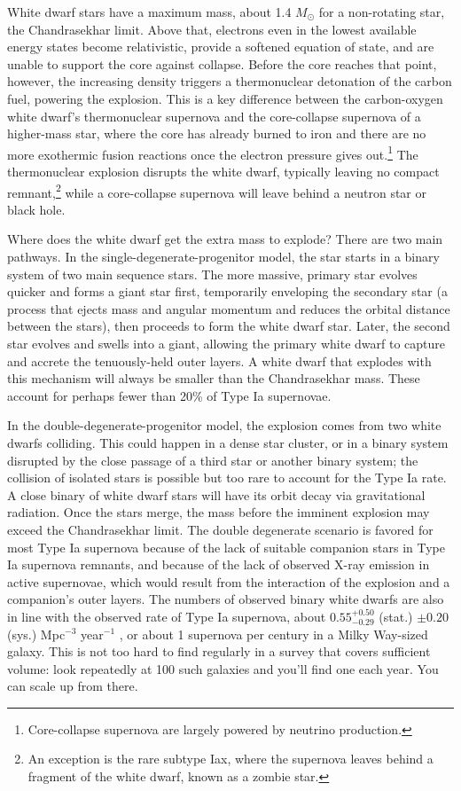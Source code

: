 White dwarf stars have a maximum mass, about 1.4 $M_\odot$ for a non-rotating star, the Chandrasekhar limit.  Above that, electrons even in the lowest available energy states become relativistic, provide a softened equation of state, and are unable to support the core against collapse.  Before the core reaches that point, however, the increasing density triggers a thermonuclear detonation of the carbon fuel, powering the explosion.  This is a key difference between the carbon-oxygen white dwarf's thermonuclear supernova and the core-collapse supernova of a higher-mass star, where the core has already burned to iron and there are no more exothermic fusion reactions once the electron pressure gives out.\footnote{Core-collapse supernova are largely powered by neutrino production.}  The thermonuclear explosion disrupts the white dwarf, typically leaving no compact remnant,\footnote{An exception is the rare subtype Iax, where the supernova leaves behind a fragment of the white dwarf, known as a zombie star.} while a core-collapse supernova will leave behind a neutron star or black hole.

Where does the white dwarf get the extra mass to explode?  There are two main pathways.  In the single-degenerate-progenitor model, the star starts in a binary system of two main sequence stars.  The more massive, primary star evolves quicker and forms a giant star first, temporarily enveloping the secondary star (a process that ejects mass and angular momentum and reduces the orbital distance between the stars), then proceeds to form the white dwarf star.  Later, the second star evolves and swells into a giant, allowing the primary white dwarf to capture and accrete the tenuously-held outer layers.  A white dwarf that explodes with this mechanism will always be smaller than the Chandrasekhar mass.  These account for perhaps fewer than 20\% of Type Ia supernovae.

In the double-degenerate-progenitor model, the explosion comes from two white dwarfs colliding.  This could happen in a dense star cluster, or in a binary system disrupted by the close passage of a third star or another binary system; the collision of isolated stars is possible but too rare to account for the Type Ia rate.  A close binary of white dwarf stars will have its orbit decay via gravitational radiation.  Once the stars merge, the mass before the imminent explosion may exceed the Chandrasekhar limit.  The double degenerate scenario is favored for most Type Ia supernova because of the lack of suitable companion stars in Type Ia supernova remnants, and because of the lack of observed X-ray emission in active supernovae, which would result from the interaction of the explosion and a companion's outer layers.  The numbers of observed binary white dwarfs are also in line with the observed rate of Type Ia supernova, about  $0.55^{+0.50}_{-0.29}$ (stat.) $\pm 0.20$ (sys.) Mpc$^{-3}$ year$^{-1}$ \citep[][]{2015A&A...584A..62C}, or about 1 supernova per century in a Milky Way-sized galaxy. This is not too hard to find regularly in a survey that covers sufficient volume: look repeatedly at 100 such galaxies and you'll find one each year. You can scale up from there.

